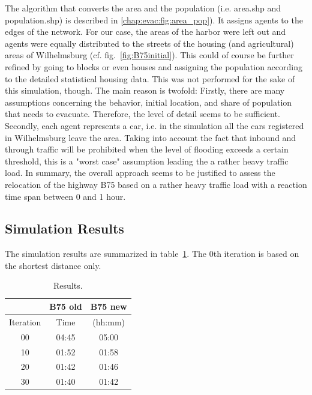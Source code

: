 The algorithm that converts the area and the population (i.e. area.shp and population.shp) is described in \ref{chap:evac:fig:area_pop}). It assigns agents to the edges of the network. For our case, the areas of the harbor were left out and agents were equally distributed to the streets of the housing (and agricultural) areas of Wilhelmsburg (cf. fig.~\ref{fig:B75initial}).
This could of course be further refined by going to blocks or even houses and assigning the population according to the detailed statistical housing data. This was not performed for the sake of this simulation, though. The main reason is twofold: Firstly, there are many assumptions concerning the behavior, initial location, and share of population that needs to evacuate. Therefore, the level of detail seems to be sufficient. Secondly, each agent represents a car, i.e. in the simulation all the cars registered in Wilhelmsburg leave the area. Taking into account the fact that inbound and through traffic will be prohibited when the level of flooding exceeds a certain threshold, this is a "worst case" assumption leading the a rather heavy traffic load. In summary, the overall approach seems to be justified to assess the relocation of the highway B75 based on a rather heavy traffic load with a reaction time span between 0 and 1 hour.

\subsection{Simulation Results}

The simulation results are summarized in table~\ref{table:b75results}. The 0th iteration is based on the shortest distance only. 

\begin{table}[!ht]
	\centering
	\caption{Results.}
	\label{table:b75results}
\begin{tabular}{|c|c|c|}
	\hline \rule[-2ex]{0pt}{5.5ex}  & B75 old & B75 new \\ 
	\hline \rule[-2ex]{0pt}{5.5ex}  Iteration & Time &  (hh:mm) \\ 
	\hline \rule[-2ex]{0pt}{5.5ex}  00 & 04:45 &  05:00\\ 
	\hline \rule[-2ex]{0pt}{5.5ex}  10 & 01:52 &  01:58\\ 
	\hline \rule[-2ex]{0pt}{5.5ex}  20 & 01:42 &  01:46\\ 
	\hline \rule[-2ex]{0pt}{5.5ex}  30 & 01:40 &  01:42\\ 
	\hline 
\end{tabular} 
\end{table}

